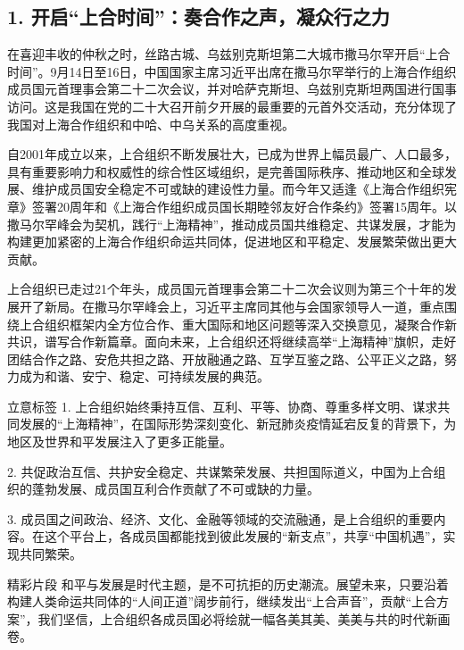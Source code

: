 \subsection*{1. 开启“上合时间”：奏合作之声，凝众行之力}

在喜迎丰收的仲秋之时，丝路古城、乌兹别克斯坦第二大城市撒马尔罕开启“上合时间”。9月14日至16日，中国国家主席习近平出席在撒马尔罕举行的上海合作组织成员国元首理事会第二十二次会议，并对哈萨克斯坦、乌兹别克斯坦两国进行国事访问。这是我国在党的二十大召开前夕开展的最重要的元首外交活动，充分体现了我国对上海合作组织和中哈、中乌关系的高度重视。

自2001年成立以来，上合组织不断发展壮大，已成为世界上幅员最广、人口最多，具有重要影响力和权威性的综合性区域组织，是完善国际秩序、推动地区和全球发展、维护成员国安全稳定不可或缺的建设性力量。而今年又适逢《上海合作组织宪章》签署20周年和《上海合作组织成员国长期睦邻友好合作条约》签署15周年。以撒马尔罕峰会为契机，践行“上海精神”，推动成员国共维稳定、共谋发展，才能为构建更加紧密的上海合作组织命运共同体，促进地区和平稳定、发展繁荣做出更大贡献。

上合组织已走过21个年头，成员国元首理事会第二十二次会议则为第三个十年的发展开了新局。在撒马尔罕峰会上，习近平主席同其他与会国家领导人一道，重点围绕上合组织框架内全方位合作、重大国际和地区问题等深入交换意见，凝聚合作新共识，谱写合作新篇章。面向未来，上合组织还将继续高举“上海精神”旗帜，走好团结合作之路、安危共担之路、开放融通之路、互学互鉴之路、公平正义之路，努力成为和谐、安宁、稳定、可持续发展的典范。

\begin{quoteBox}{立意标签}
1. 上合组织始终秉持互信、互利、平等、协商、尊重多样文明、谋求共同发展的“上海精神”，在国际形势深刻变化、新冠肺炎疫情延宕反复的背景下，为地区及世界和平发展注入了更多正能量。

2. 共促政治互信、共护安全稳定、共谋繁荣发展、共担国际道义，中国为上合组织的蓬勃发展、成员国互利合作贡献了不可或缺的力量。

3. 成员国之间政治、经济、文化、金融等领域的交流融通，是上合组织的重要内容。在这个平台上，各成员国都能找到彼此发展的“新支点”，共享“中国机遇”，实现共同繁荣。
\end{quoteBox}

\begin{quoteBox}{精彩片段}
和平与发展是时代主题，是不可抗拒的历史潮流。展望未来，只要沿着构建人类命运共同体的“人间正道”阔步前行，继续发出“上合声音”，贡献“上合方案”，我们坚信，上合组织各成员国必将绘就一幅各美其美、美美与共的时代新画卷。
\end{quoteBox}

